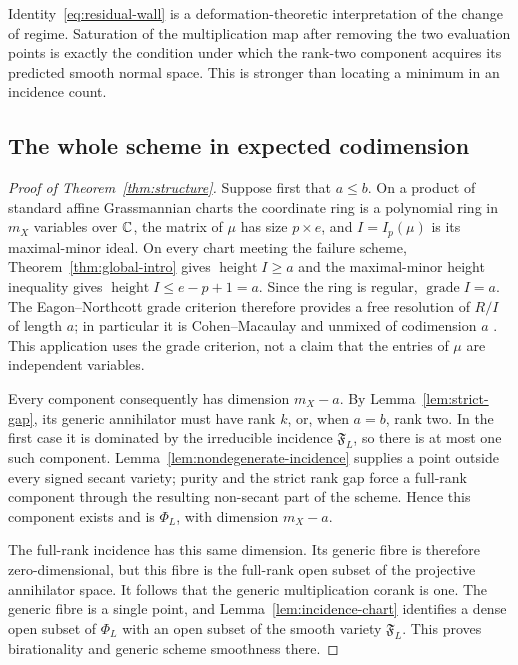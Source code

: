 Identity~\eqref{eq:residual-wall} is a deformation-theoretic interpretation of the change of regime. Saturation of the multiplication map after removing the two evaluation points is exactly the condition under which the rank-two component acquires its predicted smooth normal space. This is stronger than locating a minimum in an incidence count.

\subsection{The whole scheme in expected codimension}
\begin{proof}[Proof of Theorem~\ref{thm:structure}]
Suppose first that $a\le b$. On a product of standard affine Grassmannian charts the coordinate ring is a polynomial ring in $m_X$ variables over $\mathbb C$, the matrix of $\mu$ has size $p\times e$, and $I=I_p(\mu)$ is its maximal-minor ideal. On every chart meeting the failure scheme, Theorem~\ref{thm:global-intro} gives $\operatorname{height}I\ge a$ and the maximal-minor height inequality gives $\operatorname{height}I\le e-p+1=a$. Since the ring is regular, $\operatorname{grade}I=a$. The Eagon--Northcott grade criterion therefore provides a free resolution of $R/I$ of length $a$; in particular it is Cohen--Macaulay and unmixed of codimension $a$ \cite{EN,Kustin}. This application uses the grade criterion, not a claim that the entries of $\mu$ are independent variables.

Every component consequently has dimension $m_X-a$. By Lemma~\ref{lem:strict-gap}, its generic annihilator must have rank $k$, or, when $a=b$, rank two. In the first case it is dominated by the irreducible incidence $\mathfrak F_L$, so there is at most one such component. Lemma~\ref{lem:nondegenerate-incidence} supplies a point outside every signed secant variety; purity and the strict rank gap force a full-rank component through the resulting non-secant part of the scheme. Hence this component exists and is $\Phi_L$, with dimension $m_X-a$.

The full-rank incidence has this same dimension. Its generic fibre is therefore zero-dimensional, but this fibre is the full-rank open subset of the projective annihilator space. It follows that the generic multiplication corank is one. The generic fibre is a single point, and Lemma~\ref{lem:incidence-chart} identifies a dense open subset of $\Phi_L$ with an open subset of the smooth variety $\mathfrak F_L$. This proves birationality and generic scheme smoothness there.


\end{proof}
